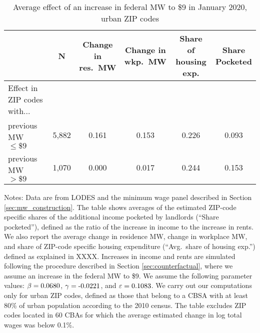 \begin{table}[hbt!]
    \centering
    \caption{Average effect of an increase in federal MW to \$9 in January 2020, urban ZIP codes}
    \label{tab:counterfactuals_fed_9usd}

    \begin{tabular}{@{}lccccc@{}}
        \toprule
                         & N & \shortstack{Change in\\res.\ MW}
                             & \shortstack{Change in\\wkp.\ MW}
                             & \shortstack{Share of\\housing exp.}  
                             & \shortstack{Share\\Pocketed}                      \\ \midrule
        Effect in ZIP codes with...          &      &       &       &     &      \\
        $\quad$previous MW $\leq\$9\quad$    & 5,882 &  0.161 & 0.153  & 0.226 &  0.093   \\
        $\quad$previous MW $>\$9\quad$       & 1,070 &  0.000 & 0.017  & 0.244 & 0.153    \\ \bottomrule
    \end{tabular}
    
    \begin{minipage}{.95\textwidth} \footnotesize
        \vspace{2mm}
        Notes: 
        Data are from LODES and the minimum wage panel described in Section 
        \ref{sec:mw_construction}.
        The table shows averages of the estimated ZIP-code specific shares of the 
        additional income pocketed by landlords (``Share pocketed''), 
        defined as the ratio of the increase in income to the increase in rents.
        We also report the average 
        change in residence MW, change in workplace MW,
        and share of ZIP-code specific housing expenditure 
        (``Avg.\ share of housing exp.'') defined as explained in XXXX.
        Increases in income and rents are simulated following the procedure 
        described in Section \ref{sec:counterfactual},
        where we assume an increase in the federal MW to \$9.
        We assume the following parameter values: 
        $\beta = \textnormal{0.0680}$, $\gamma = \textnormal{-0.0221}$, 
        and $\varepsilon = \textnormal{0.1083}$.
        We carry out our computations only for urban ZIP codes, defined as 
        those that belong to a CBSA with at least 80\% of urban population
        according to the 2010 census.
        The table excludes ZIP codes located in 60 CBAs for which the average
        estimated change in log total wages was below 0.1\%.
    \end{minipage}
\end{table}
